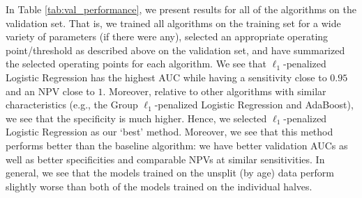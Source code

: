\documentclass[11pt, letterpaper]{amsart}
\begin{document}
In Table \ref{tab:val_performance}, we present results for all of the algorithms on the validation set. That is, we trained all algorithms on the training set for a wide variety of parameters (if there were any), selected an appropriate operating point/threshold as described above on the validation set, and have summarized the selected operating points for each algorithm. We see that $\ell_1$-penalized Logistic Regression has the highest AUC while having a sensitivity close to $0.95$ and an NPV close to $1$. Moreover, relative to other algorithms with similar characteristics (e.g., the Group $\ell_1$-penalized Logistic Regression and AdaBoost), we see that the specificity is much higher. Hence, we selected $\ell_1$-penalized Logistic Regression as our `best' method. Moreover, we see that this method performs  better than the baseline algorithm: we have better validation AUCs as well as better specificities and comparable NPVs at similar sensitivities. In general, we see that the models trained on the unsplit (by age) data perform slightly worse than both of the models trained on the individual halves. 
\end{document}
